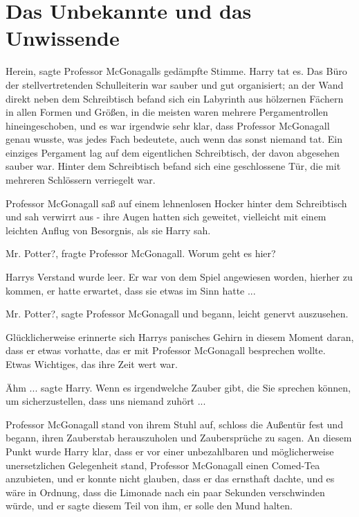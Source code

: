 \chapter{Das Unbekannte und das Unwissende}

\loq Herein\grqq{}, sagte Professor McGonagalls gedämpfte Stimme.
Harry tat es. Das Büro der stellvertretenden Schulleiterin war sauber und gut
organisiert; an der Wand direkt neben dem Schreibtisch befand sich ein Labyrinth
aus hölzernen Fächern in allen Formen und Größen, in die meisten waren mehrere
Pergamentrollen hineingeschoben, und es war irgendwie sehr klar, dass Professor
McGonagall genau wusste, was jedes Fach bedeutete, auch wenn das sonst niemand
tat. Ein einziges Pergament lag auf dem eigentlichen Schreibtisch, der davon
abgesehen sauber war. Hinter dem Schreibtisch befand sich eine geschlossene Tür,
die mit mehreren Schlössern verriegelt war.

Professor McGonagall saß auf einem lehnenlosen Hocker hinter dem Schreibtisch
und sah verwirrt aus - ihre Augen hatten sich geweitet, vielleicht mit einem
leichten Anflug von Besorgnis, als sie Harry sah.

\glqq{}Mr. Potter?\grqq{}, fragte Professor McGonagall. \glqq{}Worum geht es
hier?\grqq{}

Harrys Verstand wurde leer. Er war von dem Spiel angewiesen worden, hierher zu
kommen, er hatte erwartet, dass sie etwas im Sinn hatte ...

\glqq{}Mr. Potter?\grqq{}, sagte Professor McGonagall und begann, leicht genervt
auszusehen.

Glücklicherweise erinnerte sich Harrys panisches Gehirn in diesem Moment daran,
dass er etwas vorhatte, das er mit Professor McGonagall besprechen wollte. Etwas
Wichtiges, das ihre Zeit wert war.

\glqq{}Ähm ...\grqq{} sagte Harry. \glqq{}Wenn es irgendwelche Zauber gibt, die
Sie sprechen können, um sicherzustellen, dass uns niemand zuhört ...\grqq{}

Professor McGonagall stand von ihrem Stuhl auf, schloss die Außentür fest und
begann, ihren Zauberstab herauszuholen und Zaubersprüche zu sagen. An diesem
Punkt wurde Harry klar, dass er vor einer unbezahlbaren und möglicherweise
unersetzlichen Gelegenheit stand, Professor McGonagall einen Comed-Tea
anzubieten, und er konnte nicht glauben, dass er das ernsthaft dachte, und es
wäre in Ordnung, dass die Limonade nach ein paar Sekunden verschwinden würde,
und er sagte diesem Teil von ihm, er solle den Mund halten.

